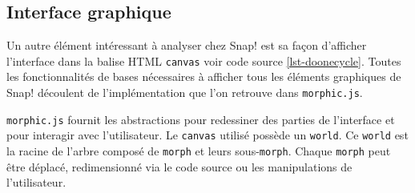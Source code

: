 % 
% 
% 

\subsection{Interface graphique}
Un autre élément intéressant à analyser chez Snap! est sa façon d'afficher l'interface dans la balise HTML \texttt{canvas} voir code source \ref{lst-doonecycle}. Toutes les fonctionnalités de bases nécessaires à afficher tous les éléments graphiques de Snap! découlent de l'implémentation que l'on retrouve dans \texttt{morphic.js}.

\texttt{morphic.js} fournit les abstractions pour redessiner des parties de l'interface et pour interagir avec l'utilisateur. Le \texttt{canvas} utilisé possède un \texttt{world}. Ce \texttt{world} est la racine de l'arbre composé de \texttt{morph} et leurs sous-\texttt{morph}. Chaque \texttt{morph} peut être déplacé, redimensionné via le code source ou les manipulations de l'utilisateur.

